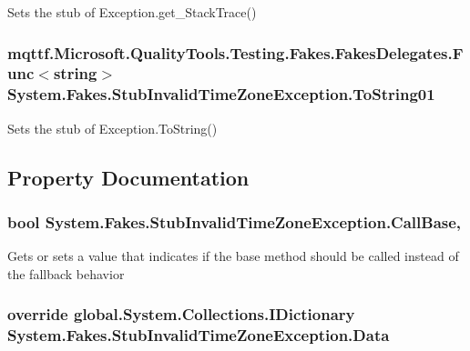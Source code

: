 Sets the stub of Exception.\-get\-\_\-\-Stack\-Trace()

\hypertarget{class_system_1_1_fakes_1_1_stub_invalid_time_zone_exception_ae713e04578bc993d52e7f28e3ff4f3df}{
\subsubsection[{To\-String01}]{\setlength{\rightskip}{0pt plus 5cm}mqttf.\-Microsoft.\-Quality\-Tools.\-Testing.\-Fakes.\-Fakes\-Delegates.\-Func$<$string$>$ System.\-Fakes.\-Stub\-Invalid\-Time\-Zone\-Exception.\-To\-String01}}\label{class_system_1_1_fakes_1_1_stub_invalid_time_zone_exception_ae713e04578bc993d52e7f28e3ff4f3df}


Sets the stub of Exception.\-To\-String()



\subsection{Property Documentation}
\hypertarget{class_system_1_1_fakes_1_1_stub_invalid_time_zone_exception_aa3b93afb52d5b50b133516a239875635}{
\subsubsection[{Call\-Base}]{\setlength{\rightskip}{0pt plus 5cm}bool System.\-Fakes.\-Stub\-Invalid\-Time\-Zone\-Exception.\-Call\-Base\hspace{0.3cm}{\ttfamily [get]}, {\ttfamily [set]}}}\label{class_system_1_1_fakes_1_1_stub_invalid_time_zone_exception_aa3b93afb52d5b50b133516a239875635}


Gets or sets a value that indicates if the base method should be called instead of the fallback behavior

\hypertarget{class_system_1_1_fakes_1_1_stub_invalid_time_zone_exception_ab59caf44c6b619bc7287c954c9cda26b}{
\subsubsection[{Data}]{\setlength{\rightskip}{0pt plus 5cm}override global.\-System.\-Collections.\-I\-Dictionary System.\-Fakes.\-Stub\-Invalid\-Time\-Zone\-Exception.\-Data\hspace{0.3cm}{\ttfamily [get]}}}\label{class_system_1_1_fakes_1_1_stub_invalid_time_zone_exception_ab59caf44c6b619bc7287c954c9cda26b}


